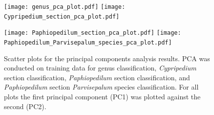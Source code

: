 \documentclass[twocolumn]{bmcart}
\begin{document}
\begin{backmatter}
\begin{figure}[!h]
    \minipage{\textwidth}
        \texttt{[image: genus\_pca\_plot.pdf]}
        \texttt{[image: Cypripedium\_section\_pca\_plot.pdf]}
    \endminipage
    \par\vfill
    \minipage{\textwidth}
        \texttt{[image: Paphiopedilum\_section\_pca\_plot.pdf]}
        \texttt{[image: Paphiopedilum\_Parvisepalum\_species\_pca\_plot.pdf]}
    \endminipage
    \caption{Scatter plots for the principal components analysis results. PCA was conducted on training data for genus classification, \textit{Cypripedium} section classification, \textit{Paphiopedilum} section classification, and \textit{Paphiopedilum} section \textit{Parvisepalum} species classification. For all plots the first principal component (PC1) was plotted against the second (PC2).}
    \label{fig:pca-plots}
\end{figure}

\end{backmatter}
\end{document}
